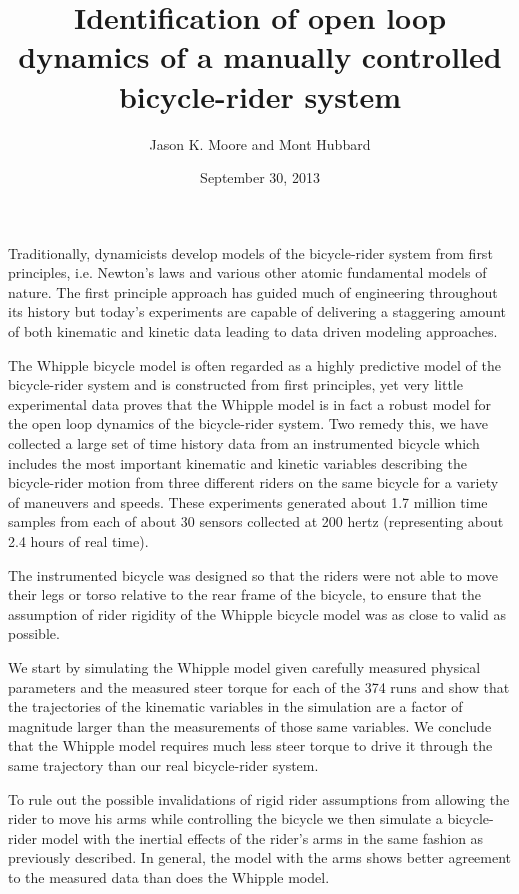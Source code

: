 \documentclass[a4paper]{article}
\title{Identification of open loop dynamics of a manually controlled
bicycle-rider system}
\author{Jason K. Moore and Mont Hubbard}
\date{September 30, 2013}
\begin{document}
\maketitle

Traditionally, dynamicists develop models of the bicycle-rider system from
first principles, i.e. Newton's laws and various other atomic fundamental
models of nature. The first principle approach has guided much of engineering
throughout its history but today's experiments are capable of delivering a
staggering amount of both kinematic and kinetic data leading to data driven
modeling approaches.

The Whipple bicycle model is often regarded as a highly predictive model of the
bicycle-rider system and is constructed from first principles, yet very little
experimental data proves that the Whipple model is in fact a robust model for
the open loop dynamics of the bicycle-rider system. Two remedy this, we have
collected a large set of time history data from an instrumented bicycle which
includes the most important kinematic and kinetic variables describing the
bicycle-rider motion from three different riders on the same bicycle for a
variety of maneuvers and speeds. These experiments generated about 1.7 million
time samples from each of about 30 sensors collected at 200 hertz (representing
about 2.4 hours of real time).

The instrumented bicycle was designed so that the riders were not able to move
their legs or torso relative to the rear frame of the bicycle, to ensure that
the assumption of rider rigidity of the Whipple bicycle model was as close to
valid as possible.

We start by simulating the Whipple model given carefully measured physical
parameters and the measured steer torque for each of the 374 runs and show that
the trajectories of the kinematic variables in the simulation are a factor of
magnitude larger than the measurements of those same variables. We conclude
that the Whipple model requires much less steer torque to drive it through the
same trajectory than our real bicycle-rider system.

To rule out the possible invalidations of rigid rider assumptions from allowing
the rider to move his arms while controlling the bicycle we then simulate a
bicycle-rider model with the inertial effects of the rider's arms in the same
fashion as previously described. In general, the model with the arms shows
better agreement to the measured data than does the Whipple model.
\end{document}
